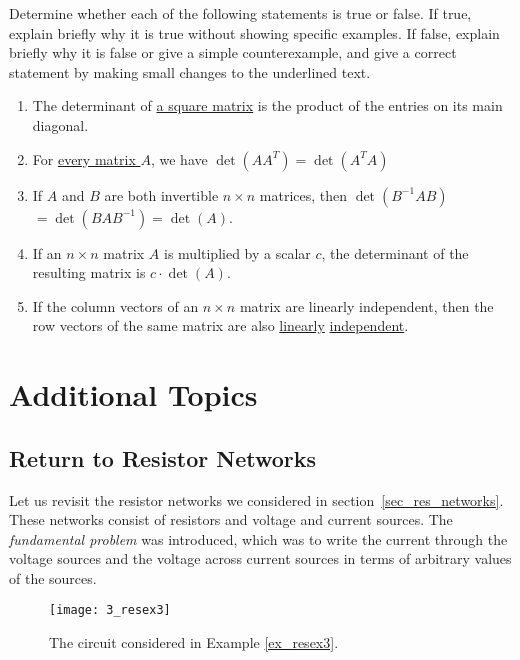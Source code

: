 \begin{problem}
\label{2009_a9_5}
Determine whether each of the following statements is true or false. If true, explain briefly why it is true without showing specific examples. If false, explain briefly why it is false or give a simple counterexample, and give a correct statement by making small changes to the underlined text.
    \begin{enumerate}
    \item The determinant of \underline{a square matrix} is the product of the entries on its main diagonal.

    \item For \underline{every matrix $A$}, we have $\det(AA^T) = \det(A^TA)$

    \item If $A$ and $B$ are both invertible $n \times n$ matrices, then \underline{$\det(B^{-1}AB)$} \underline{$= \det(BAB^{-1}) = \det(A)$}.

    \item If an $n\times n$ matrix $A$ is multiplied by a scalar $c$, the determinant of the resulting matrix is \underline{$c\cdot\det(A)$}.

    \item If the column vectors of an $n\times n$ matrix are linearly independent, then the row vectors of the same matrix are also \underline{linearly} \underline{independent}.
    \end{enumerate}
\end{problem}

\section{Additional Topics}

\subsection{Return to Resistor Networks}
\label{sec:retres}

Let us revisit the resistor networks we considered in section~\ref{sec_res_networks}. These
networks consist of resistors and voltage and current sources. The {\em fundamental 
problem} was introduced, which was to write the current through the 
voltage sources and the voltage across current sources in terms of arbitrary 
values of the sources.

\begin{figure}
\centerline{\texttt{[image: 3\_resex3]}}
\caption{The circuit considered in Example \ref{ex_resex3}. \label{newresf1}}
\end{figure}

